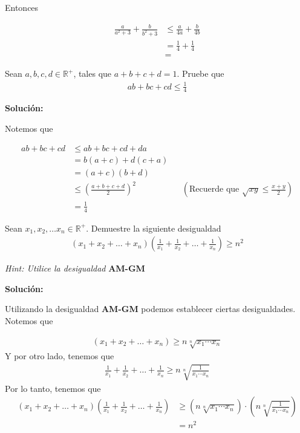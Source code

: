 \documentclass[12pt]{book}
\begin{document}
Entonces 

\begin{align*}
    \frac{a}{a^2+3} + \frac{b}{b^2+3} &\leq \frac{a}{4a} +\frac{b}{4b} \\
    &=\frac{1}{4}+\frac{1}{4} \\
    &=
\end{align*}

\begin{prob}{}{}
Sean $a,b,c,d \in \mathbb{R}^+$, tales que $a+b+c+d=1$. Pruebe que 
\begin{align*}
    ab+bc+cd \leq \frac{1}{4}
\end{align*}
\end{prob}
\textbf{Solución:}

Notemos que 

\begin{align*}
      ab+bc+cd&\leq ab+bc+cd+da \\
      &=b(a+c)+d(c+a) \\
      &=(a+c)(b+d) \\
      &\leq \left( \frac{a+b+c+d}{2} \right)^2 && \left(\text{Recuerde que } \sqrt{xy} \leq \frac{x+y}{2}\right)\\
      &=\frac{1}{4}
\end{align*}

\begin{prob}{}{}
    Sean $x_1,x_2, \ldots x_n \in \mathbb{R}^+$. Demuestre la siguiente desigualdad 
 \begin{align*}
     (x_1+x_2+\dots +x_n)\left(\frac{1}{x_1}+\frac{1}{x_2}+\dots + \frac{1}{x_n}\right) \geq n^2
 \end{align*}

    \emph{Hint: Utilice la desigualdad} \textbf{AM-GM}
 
\end{prob}
\textbf{Solución:}

Utilizando la desigualdad \textbf{AM-GM} podemos establecer ciertas desigualdades. Notemos que 

\begin{align*}
    (x_1+x_2+\dots +x_n) \geq n \sqrt[n]{x_1 \cdots x_n}
\end{align*}
Y por otro lado, tenemos que 
\begin{align*}
    \frac{1}{x_1}+\frac{1}{x_2}+\dots + \frac{1}{x_n} \geq n \sqrt[n]{\frac{1}{x_1 \cdots x_n}}
\end{align*}
Por lo tanto, tenemos que 
\begin{align*}
     (x_1+x_2+\dots +x_n)\left(\frac{1}{x_1}+\frac{1}{x_2}+\dots + \frac{1}{x_n}\right) &\geq \left(n \sqrt[n]{x_1 \cdots x_n}\right)\cdot\left(n \sqrt[n]{\frac{1}{x_1 \cdots x_n}}\right) \\
     &=n^2
\end{align*}
\end{document}
